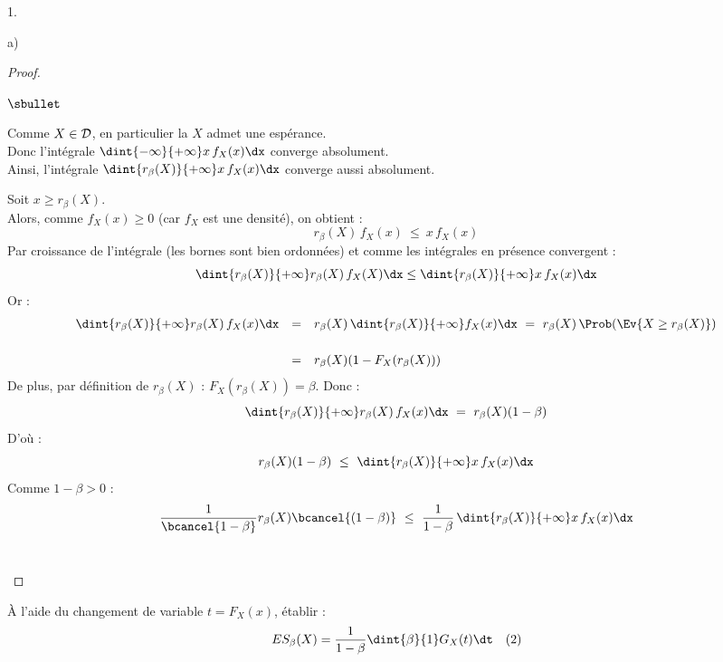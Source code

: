 \documentclass[11pt]{article}%
\begin{document}
\begin{noliste}{1.}
\begin{noliste}{a)}
    \begin{proof}~
      \begin{noliste}{$\sbullet$}
	\item Comme $X\in {\cal D}$, en particulier la \var $X$ 
	admet une espérance.\\
	Donc l'intégrale $\dint{-\infty}{+\infty} x \, f_X(x) \dx$
	converge absolument.\\
	Ainsi, l'intégrale $\dint{r_\beta(X)}{+\infty} x\, f_X(x) \dx$
	converge aussi absolument.
	
	
	\newpage
	
	
	\item Soit $x \geq r_\beta(X)$.\\
	Alors, comme $f_X(x) \geq 0$ (car $f_X$ est une densité), on 
	obtient :
	\[
	  r_\beta(X) \, f_X(x) \ \leq \ x \, f_X(x)
	\]
	Par croissance de l'intégrale (les bornes sont bien 
	ordonnées) et comme les intégrales en présence convergent :
	\[
	  \dint{r_\beta(X)}{+\infty} r_\beta(X) \, f_X(X) \dx
	  \leq \dint{r_\beta(X)}{+\infty} x\, f_X(x) \dx
	\]
	Or :
	\[
	\begin{array}{rcl}
	  \dint{r_\beta(X)}{+\infty} r_\beta(X) \, f_X(x) \dx
	  & = & r_\beta(X) \, \dint{r_\beta(X)}{+\infty} f_X(x) \dx
	  \ = \ r_\beta(X) \, \Prob(\Ev{X \geq r_\beta(X)})
	  \\[.6cm]
	  & = & r_\beta(X) (1-F_X(r_\beta(X)))
	\end{array}
	\]
	De plus, par définition de $r_\beta(X)$ : $F_X(r_\beta(X)) 
	=\beta$. Donc :
	\[
	  \dint{r_\beta(X)}{+\infty} r_\beta(X) \, f_X(x) \dx \ = \
	  r_\beta(X)(1-\beta)
	\]
	D'où :
	\[
	  r_\beta(X) (1-\beta) \ \leq \ \dint{r_\beta(X)}{+\infty}
	  x\, f_X(x) \dx
	\]
	Comme $1-\beta>0$ :
	\[
	  \dfrac{1}{\bcancel{1-\beta}} r_\beta(X) \bcancel{(1-\beta)}
	  \ \leq \ \dfrac{1}{1-\beta} \, \dint{r_\beta(X)}{+\infty}
	  x\, f_X(x) \dx
	\]
	~\\[-1.2cm]
      \end{noliste}
    \end{proof}
    
    \item À l'aide du changement de variable $t=F_X(x)$, établir :
    \[
      ES_\beta(X)=\dfrac{1}{1-\beta} \dint{\beta}{1} G_X(t) \dt 
      \quad (2)
    \]
    

\end{noliste}
\end{noliste}
\end{document}
